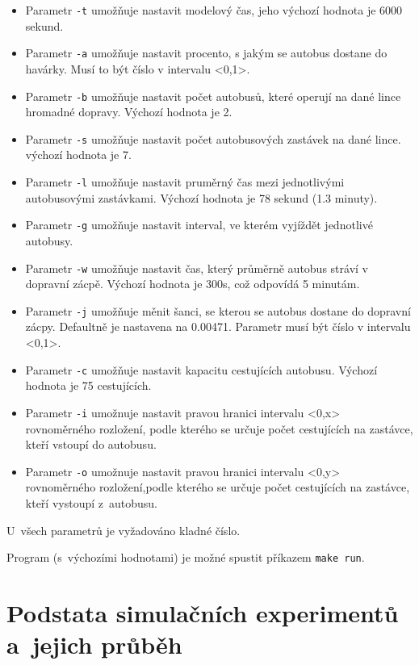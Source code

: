 \documentclass[a4paper]{article}
\begin{document}
            \begin{itemize}
                \item Parametr \texttt{-t} umožňuje nastavit modelový čas, jeho výchozí hodnota je 6000 sekund.
                \item Parametr \texttt{-a} umožňuje nastavit procento, s jakým se autobus dostane do havárky. Musí to být číslo v intervalu <0,1>.
                \item Parametr \texttt{-b} umožňuje nastavit počet autobusů, které operují na dané lince hromadné dopravy. Výchozí hodnota je 2.
                \item Parametr \texttt{-s} umožňuje nastavit počet autobusových zastávek na dané lince. výchozí hodnota je 7.
                \item Parametr \texttt{-l} umožňuje nastavit pruměrný čas mezi jednotlivými autobusovými zastávkami. Výchozí hodnota je 78 sekund (1.3 minuty).
                \item Parametr \texttt{-g} umožňuje nastavit interval, ve kterém vyjíždět jednotlivé autobusy.
                \item Parametr \texttt{-w} umožňuje nastavit čas, který průměrně autobus stráví v dopravní zácpě. Výchozí hodnota je 300s, což odpovídá 5 minutám.
                \item Parametr \texttt{-j} umožňuje měnit šanci, se kterou se autobus dostane do dopravní zácpy. Defaultně je nastavena na 0.00471. Parametr musí být číslo v intervalu <0,1>.
                \item Parametr \texttt{-c} umožňuje nastavit kapacitu cestujících autobusu. Výchozí hodnota je 75 cestujících.
            
            \item Parametr \texttt{-i} umožnuje nastavit pravou hranici intervalu <0,x> rovnoměrného rozložení, podle kterého se určuje počet cestujících na zastávce, kteří vstoupí do autobusu.
            \item Parametr \texttt{-o} umožnuje nastavit pravou hranici intervalu <0,y> rovnoměrného rozložení,podle kterého se určuje počet cestujících na zastávce, kteří vystoupí z~autobusu.
            \end{itemize}

            U~všech parametrů je vyžadováno kladné číslo.

            Program (s~výchozími hodnotami) je možné spustit příkazem \texttt{make run}.

    \section{Podstata simulačních experimentů a~jejich průběh}
    \label{sec:simulation}
\end{document}
